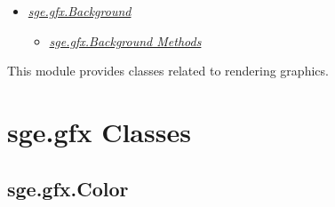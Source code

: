 \documentclass[letterpaper,10pt,english]{sphinxmanual}
\begin{document}
{\begin{minipage}{0.95\linewidth}
\begin{itemize}
\begin{itemize}
\begin{itemize}
\item {} 
\label{gfx:id10}{\hyperref[gfx:sge\string-gfx\string-background]{\emph{sge.gfx.Background}}}
\begin{itemize}
\item {} 
\label{gfx:id11}{\hyperref[gfx:sge\string-gfx\string-background\string-methods]{\emph{sge.gfx.Background Methods}}}

\end{itemize}

\end{itemize}

\end{itemize}

\end{itemize}
\end{minipage}}
\begin{center}\setlength{\fboxsep}{5pt}\end{center}
\label{gfx:module-sge.gfx}
This module provides classes related to rendering graphics.


\section{sge.gfx Classes}
\label{gfx:sge-gfx-classes}

\subsection{sge.gfx.Color}
\label{gfx:sge-gfx-color}
\end{document}
